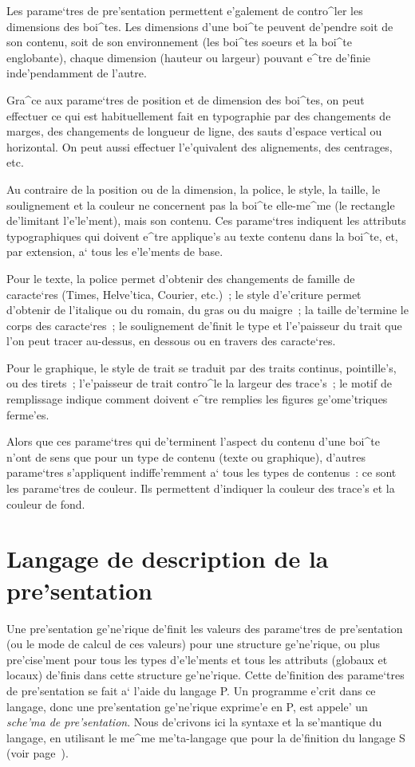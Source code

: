 {Les parame`tres de pre'sentation permettent e'galement de contro^ler les
dimensions des boi^tes. Les dimensions d'une boi^te peuvent de'pendre soit
de son contenu, soit de son environnement (les boi^tes soeurs et la
boi^te englobante), chaque dimension (hauteur ou largeur) pouvant
e^tre de'finie inde'pendamment de l'autre.

Gra^ce aux parame`tres de position et de dimension des boi^tes, on peut
effectuer ce qui est habituellement fait en typographie par des changements
de marges, des changements de longueur de ligne, des sauts d'espace
vertical ou horizontal. On peut aussi effectuer l'e'quivalent
des alignements, des centrages, etc.

Au contraire de la position ou de la dimension, la police, le style,
la taille, le soulignement et la couleur ne concernent pas la boi^te
elle-me^me (le rectangle de'limitant l'e'le'ment), mais son contenu.
Ces parame`tres indiquent les attributs typographiques qui doivent e^tre
applique's au texte contenu dans la boi^te, et, par extension, a` tous les
e'le'ments de base.

Pour le texte, la police permet d'obtenir des
changements de famille de caracte`res (Times, Helve'tica, Courier, etc.)~;
le style d'e'criture permet d'obtenir de l'italique ou du romain, du gras
ou du maigre~; la taille de'termine le corps des caracte`res~; le soulignement
de'finit le type et l'e'paisseur du trait que l'on peut tracer au-dessus,
en dessous ou en travers des caracte`res.

Pour le graphique, le style de trait se traduit par des traits continus,
pointille's, ou des tirets~; l'e'paisseur de trait contro^le la largeur
des trace's~; le motif de remplissage indique comment doivent e^tre remplies
les figures ge'ome'triques ferme'es.

Alors que ces parame`tres qui de'terminent l'aspect du contenu d'une boi^te
n'ont de sens que pour un type de contenu (texte ou graphique), d'autres
parame`tres s'appliquent indiffe'remment a` tous les types de contenus~:
ce sont les parame`tres de couleur. Ils permettent d'indiquer la couleur
des trace's et la couleur de fond.

\section{Langage de description de la pre'sentation}
\label{langp}

Une pre'sentation ge'ne'rique de'finit les valeurs des parame`tres de pre'sentation
(ou le mode de calcul de ces valeurs) pour une structure ge'ne'rique, ou plus
pre'cise'ment pour tous les types d'e'le'ments et tous les attributs (globaux et
locaux) de'finis dans cette structure ge'ne'rique.
Cette de'finition des parame`tres de pre'sentation
se fait a` l'aide du langage P. Un programme e'crit dans
ce langage, donc une pre'sentation ge'ne'rique exprime'e en P, est appele' un
{\em sche'ma de pre'sentation}. Nous de'crivons ici la syntaxe et la se'mantique
du langage, en utilisant le me^me me'ta-langage que pour la de'finition du
langage S (voir page~\pageref{metalang}).

}
